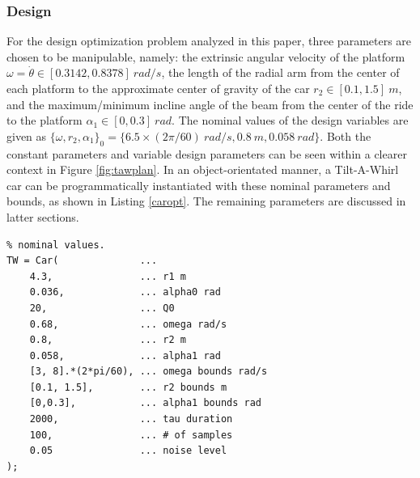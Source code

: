 \documentclass{article}
\begin{document}
\subsubsection{Design}
For the design optimization problem analyzed in this paper, three parameters are chosen to be manipulable, namely: the extrinsic angular velocity of the platform $\omega = \dot{\theta} \in [0.3142,0.8378] ~ rad/s$, the length of the radial arm from the center of each platform to the approximate center of gravity of the car $r_2 \in \left[0.1,1.5\right]~m$, and the maximum/minimum incline angle of the beam from the center of the ride to the platform $\alpha_1 \in \left[0,0.3\right] ~ rad$. The nominal values of the design variables are given as $\{\omega,r_2,\alpha_1\}_0 = \{6.5\times(2\pi/60) ~rad/s, 0.8~m, 0.058~rad\}$. Both the constant parameters and variable design parameters can be seen within a clearer context in Figure \ref{fig:tawplan}. In an object-orientated manner, a Tilt-A-Whirl car can be programmatically instantiated with these nominal parameters and bounds, as shown in Listing \ref{caropt}. The remaining parameters are discussed in latter sections.

\begin{lstlisting}[caption=Nominal Tilt-A-Whirl Car, label=caropt]
% Instantiate car with
% nominal values.
TW = Car(              ...
    4.3,               ... r1 m
    0.036,             ... alpha0 rad
    20,                ... Q0
    0.68,              ... omega rad/s
    0.8,               ... r2 m
    0.058,             ... alpha1 rad
    [3, 8].*(2*pi/60), ... omega bounds rad/s
    [0.1, 1.5],        ... r2 bounds m
    [0,0.3],           ... alpha1 bounds rad
    2000,              ... tau duration
    100,               ... # of samples
    0.05               ... noise level
);
\end{lstlisting}
\end{document}
